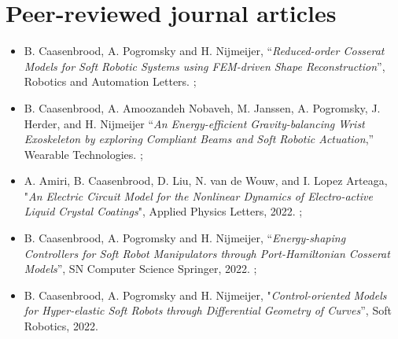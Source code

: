 \section*{Peer-reviewed journal articles}
\begin{itemize}[leftmargin=4mm]
\item B. Caasenbrood, A. Pogromsky and H. Nijmeijer, “\textit{Reduced-order Cosserat Models for Soft Robotic
 Systems using FEM-driven Shape Reconstruction}”, Robotics and Automation Letters. \ipj;
\item B. Caasenbrood, A. Amoozandeh Nobaveh, M. Janssen, A. Pogromsky, J. Herder, and H. Nijmeijer “\textit{An Energy-efficient Gravity-balancing Wrist Exoskeleton by exploring Compliant Beams and Soft Robotic Actuation},” Wearable Technologies. \ipj;
\item A. Amiri, B. Caasenbrood, D. Liu, N. van de Wouw, and I. Lopez Arteaga, "\textit{An Electric Circuit Model for the Nonlinear Dynamics of Electro-active Liquid Crystal Coatings}", Applied Physics Letters, 2022. \cur;
\item  B. Caasenbrood, A. Pogromsky and H. Nijmeijer, “\textit{Energy-shaping Controllers for Soft Robot Manipulators through Port-Hamiltonian Cosserat Models}”, SN Computer Science Springer, 2022. \cur;
\item B. Caasenbrood, A. Pogromsky and H. Nijmeijer, "\textit{Control-oriented Models for Hyper-elastic Soft Robots through Differential Geometry of Curves}”, Soft Robotics, 2022.
\end{itemize}

